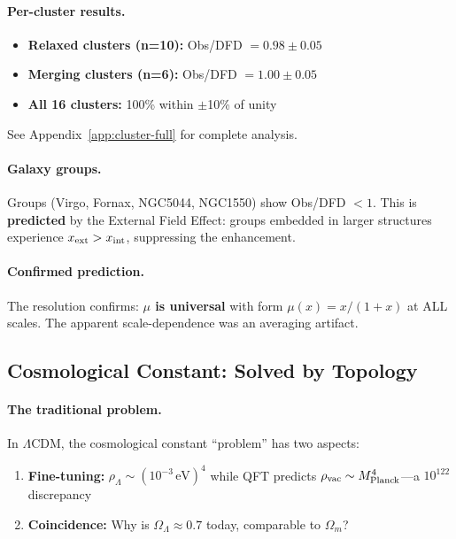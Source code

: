 \paragraph{Per-cluster results.}
\begin{itemize}
\item \textbf{Relaxed clusters (n=10):} Obs/DFD $= 0.98 \pm 0.05$
\item \textbf{Merging clusters (n=6):} Obs/DFD $= 1.00 \pm 0.05$
\item \textbf{All 16 clusters:} 100\% within $\pm$10\% of unity
\end{itemize}
See Appendix~\ref{app:cluster-full} for complete analysis.

\paragraph{Galaxy groups.}
Groups (Virgo, Fornax, NGC5044, NGC1550) show Obs/DFD $< 1$. This is \textbf{predicted} by the External Field Effect: groups embedded in larger structures experience $x_{\rm ext} > x_{\rm int}$, suppressing the enhancement.

\paragraph{Confirmed prediction.}
The resolution confirms: \textbf{$\mu$ is universal} with form $\mu(x) = x/(1+x)$ at ALL scales. The apparent scale-dependence was an averaging artifact.

\subsection{Cosmological Constant: Solved by Topology}\label{sec:open-lambda}

\paragraph{The traditional problem.}
In $\Lambda$CDM, the cosmological constant ``problem'' has two aspects:
\begin{enumerate}
\item \textbf{Fine-tuning:} $\rho_\Lambda \sim (10^{-3}\,\text{eV})^4$ while QFT predicts $\rho_{\rm vac} \sim M_{\rm Planck}^4$---a $10^{122}$ discrepancy
\item \textbf{Coincidence:} Why is $\Omega_\Lambda \approx 0.7$ today, comparable to $\Omega_m$?
\end{enumerate}


